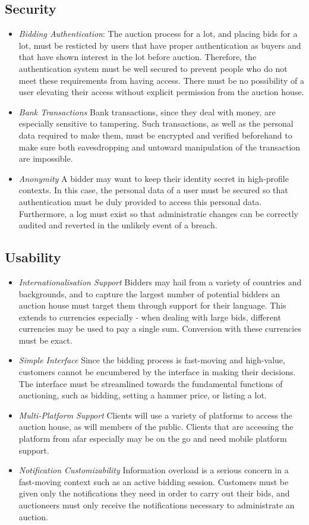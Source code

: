 \documentclass[titlepage, 12pt]{extarticle}
\begin{document}
\subsection{Security}
\begin{itemize}
\item {\it Bidding Authentication}: The auction process for a lot, and placing bids for a lot, must be resticted by users that have proper authentication as buyers and that have shown interest in the lot before auction. Therefore, the authentication system must be well secured to prevent people who do not meet these requirements from having access. There must be no possibility of a user elevating their access without explicit permission from the auction house.
\item {\it Bank Transactions} Bank transactions, since they deal with money, are especially sensitive to tampering. Such transactions, as well as the personal data required to make them, must be encrypted and verified beforehand to make sure both eavesdropping and untoward manipulation of the transaction are impossible.
\item {\it Anonymity} A bidder may want to keep their identity secret in high-profile contexts. In this case, the personal data of a user must be secured so that authentication must be duly provided to access this personal data. Furthermore, a log must exist so that administratie changes can be correctly audited and reverted in the unlikely event of a breach.
\end{itemize}
\subsection{Usability}
\begin{itemize}
\item {\it Internationalisation Support} Bidders may hail from a variety of countries and backgrounds, and to capture the largest number of potential bidders an auction house must target them through support for their language. This extends to currencies especially - when dealing with large bids, different currencies may be used to pay a single sum. Conversion with these currencies must be exact.
\item {\it Simple Interface} Since the bidding process is fast-moving and high-value, customers cannot be encumbered by the interface in making their decisions. The interface must be streamlined towards the fundamental functions of auctioning, such as bidding, setting a hammer price, or listing a lot.
\item {\it Multi-Platform Support} Clients will use a variety of platforms to access the auction house, as will members of the public. Clients that are accessing the platform from afar especially may be on the go and need mobile platform support.
\item {\it Notification Customizability} Information overload is a serious concern in a fast-moving context such as an active bidding session. Customers must be given only the notifications they need in order to carry out their bids, and auctioneers must only receive the notifications necessary to administrate an auction.
\end{itemize}
\end{document}
